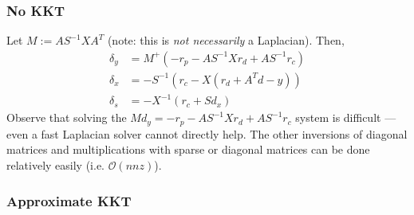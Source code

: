 \documentclass[10pt,a4paper]{article}
\newcommand{\Oo}{\mathcal{O}}
\begin{document}
\subsubsection{No KKT}

Let $M := AS^{-1}XA^T$ (note: this is \emph{not necessarily} a Laplacian). Then,
\begin{align*}
\delta_y &= M^+(-r_p - AS^{-1}Xr_d + AS^{-1}r_c) \\
\delta_x &= -S^{-1}(r_c - X(r_d + A^Td-y))\\
\delta_s &= -X^{-1}(r_c + Sd_x)
\end{align*}
Observe that solving the $Md_y = -r_p - AS^{-1}Xr_d + AS^{-1}r_c$ system is difficult --- even a fast Laplacian solver cannot directly help. The other inversions of diagonal matrices and multiplications with sparse or diagonal matrices can be done relatively easily (i.e. $\Oo(nnz)$).

\subsubsection{Approximate KKT}
\end{document}
